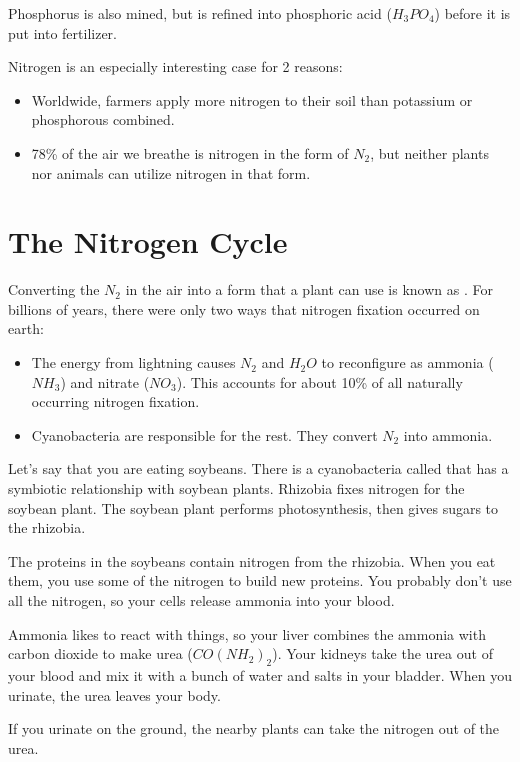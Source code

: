 Phosphorus is also mined, but is refined into phosphoric acid
($H_3PO_4$) before it is put into fertilizer.

Nitrogen is an especially interesting case for 2 reasons:
\begin{itemize}
\item Worldwide, farmers apply more nitrogen to their soil than potassium or phosphorous combined.
\item 78\% of the air we breathe is nitrogen in the form of $N_2$, but
  neither plants nor animals can utilize nitrogen in that form.
\end{itemize}

\section{The Nitrogen Cycle}

Converting the $N_2$ in the air into a form that a plant can use
is known as . For billions of years, there
were only two ways that nitrogen fixation occurred on earth:
\begin{itemize}
\item The energy from lightning causes $N_2$ and $H_2O$ to reconfigure as ammonia ($NH_3$) and nitrate ($NO_3$). This accounts for about 10\% of all naturally occurring nitrogen fixation.
\item Cyanobacteria are responsible for the rest. They convert $N_2$ into ammonia.
\end{itemize} 

Let's say that you are eating soybeans. There is a cyanobacteria
called  that has a symbiotic relationship with
soybean plants. Rhizobia fixes nitrogen for the soybean plant. The
soybean plant performs photosynthesis, then gives sugars to the
rhizobia.

The proteins in the soybeans contain nitrogen from the rhizobia. When
you eat them, you use some of the nitrogen to build new proteins. You
probably don't use all the nitrogen, so your cells release ammonia into your blood.

Ammonia likes to react with things, so your liver combines the ammonia
with carbon dioxide to make urea ($CO(NH_2)_2$). Your kidneys take
the urea out of your blood and mix it with a bunch of water and salts
in your bladder.  When you urinate, the urea leaves your body.

If you urinate on the ground, the nearby plants can take the nitrogen out of
the urea.

